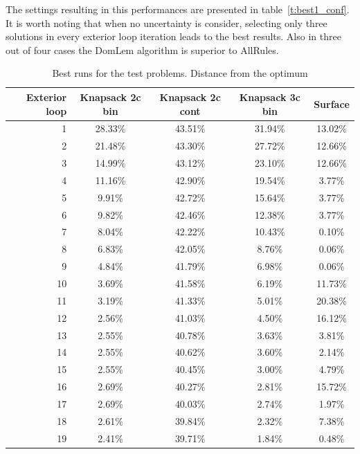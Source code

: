 The settings resulting in this performances are presented in
table~\ref{t:best1_conf}. It is worth noting that when no uncertainty is
consider, selecting only three solutions in every exterior loop iteration
leads to the best results. Also in three out of four cases the DomLem algorithm is
superior to AllRules.

\begin{table}[h]
  \centering
  \begin{tabular}{r c c c c}
    \hline
    Exterior loop & Knapsack 2c bin & Knapsack 2c cont & Knapsack 3c bin & Surface \\
    \hline
    1 & 28.33\% & 43.51\% & 31.94\% & 13.02\% \\
    2 & 21.48\% & 43.30\% & 27.72\% & 12.66\% \\
    3 & 14.99\% & 43.12\% & 23.10\% & 12.66\% \\
    4 & 11.16\% & 42.90\% & 19.54\% & 3.77\% \\
    5 & 9.91\% & 42.72\% & 15.64\% & 3.77\% \\
    6 & 9.82\% & 42.46\% & 12.38\% & 3.77\% \\
    7 & 8.04\% & 42.22\% & 10.43\% & 0.10\% \\
    8 & 6.83\% & 42.05\% & 8.76\% & 0.06\% \\
    9 & 4.84\% & 41.79\% & 6.98\% & 0.06\% \\
    10 & 3.69\% & 41.58\% & 6.19\% & 11.73\% \\
    11 & 3.19\% & 41.33\% & 5.01\% & 20.38\% \\
    12 & 2.56\% & 41.03\% & 4.50\% & 16.12\% \\
    13 & 2.55\% & 40.78\% & 3.63\% & 3.81\% \\
    14 & 2.55\% & 40.62\% & 3.60\% & 2.14\% \\
    15 & 2.55\% & 40.45\% & 3.00\% & 4.79\% \\
    16 & 2.69\% & 40.27\% & 2.81\% & 15.72\% \\
    17 & 2.69\% & 40.03\% & 2.74\% & 1.97\% \\
    18 & 2.61\% & 39.84\% & 2.32\% & 7.38\% \\
    19 & 2.41\% & 39.71\% & 1.84\% & 0.48\% \\
    \hline
  \end{tabular}
  \caption{Best runs for the test problems. Distance from the optimum}
  \label{t:best1}
\end{table} 

